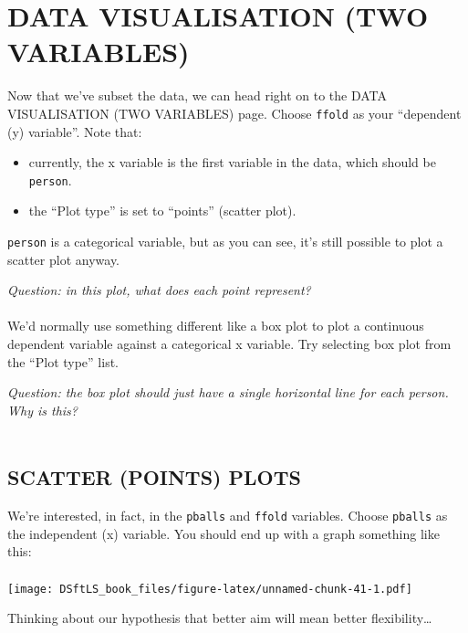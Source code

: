 \documentclass[
]{book}
\providecommand{\tightlist}{%
  \setlength{\itemsep}{0pt}\setlength{\parskip}{0pt}}
\begin{document}
\hypertarget{data-visualisation-two-variables}{%
\section{DATA VISUALISATION (TWO VARIABLES)}\label{data-visualisation-two-variables}}

Now that we've subset the data, we can head right on to the DATA VISUALISATION
(TWO VARIABLES) page. Choose \texttt{ffold} as your ``dependent (y) variable''. Note that:

\begin{itemize}
\tightlist
\item
  currently, the x variable is the first variable in the data, which should be
  \texttt{person}.
\item
  the ``Plot type'' is set to ``points'' (scatter plot).
\end{itemize}

\texttt{person} is a categorical variable, but as you can see, it's still possible to
plot a scatter plot anyway.

\emph{Question: in this plot, what does each point represent?}\\
~\\

We'd normally use something different like a box plot to plot a continuous
dependent variable against a categorical x variable. Try selecting box plot from
the ``Plot type'' list.

\emph{Question: the box plot should just have a single horizontal line for each
person. Why is this?}\\
~\\

\hypertarget{scatter-points-plots}{%
\subsection{SCATTER (POINTS) PLOTS}\label{scatter-points-plots}}

We're interested, in fact, in the \texttt{pballs} and \texttt{ffold} variables. Choose
\texttt{pballs} as the independent (x) variable. You should end up with a graph something
like this:\\
~\\

\texttt{[image: DSftLS\_book\_files/figure-latex/unnamed-chunk-41-1.pdf]}

Thinking about our hypothesis that
better aim will mean better flexibility\ldots{}
\end{document}
